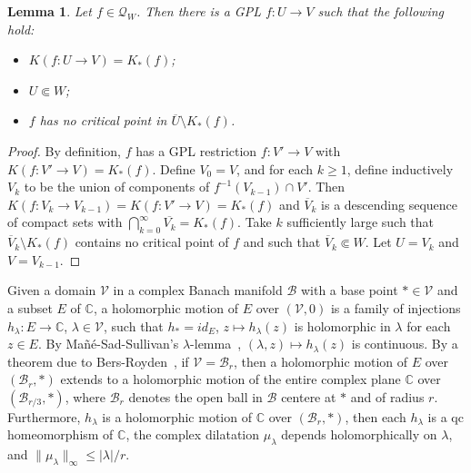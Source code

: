 \documentclass{amsart}
\numberwithin{equation}{section}
\newtheorem{lemma}[theorem]{Lemma}%
\newcommand{\C}{\mathbb C}
\theoremstyle{definition}
\theoremstyle{remark}
\begin{document}
\begin{lemma} \label{lem:smallglp}
Let $f\in \mathcal{Q}_W$. Then there is a GPL $f:U\to V$ such that the following hold:
\begin{itemize} 
\item $K(f:U\to V)=K_*(f)$; 
\item $U\Subset W$; 
\item $f$ has no critical point in $\overline{U}\setminus K_*(f)$. 
\end{itemize}
\end{lemma}
\begin{proof} By definition, $f$ has a GPL restriction $f:V'\to V$ with $K(f:V'\to V)=K_*(f)$. Define $V_0=V$, 
and for each $k\ge 1$, define inductively $V_k$ to be the union of components of $f^{-1}(V_{k-1})\cap V'$. Then $K(f:V_k\to V_{k-1})=K(f:V'\to V)=K_*(f)$ and $\overline{V}_k$ is a descending sequence of compact sets with $\bigcap_{k=0}^\infty \overline{V_k}=K_*(f)$. Take $k$ sufficiently large such that $\overline{V}_k\setminus K_*(f)$ contains no critical point of $f$ and such that $\overline{V}_k\Subset W$. Let $U=V_k$ and $V=V_{k-1}$. 
\end{proof}
Given a domain $\mathcal{V}$ in a complex Banach manifold $\mathcal{B}$ with a base point $\ast\in \mathcal{V}$ and a subset $E$ of $\C$, a holomorphic motion of $E$ over $(\mathcal{V},0)$ is a family of injections $h_\lambda:E\to \C$, $\lambda\in \mathcal{V}$, such that $h_*=id_E$, $z\mapsto h_\lambda(z)$ is holomorphic in $\lambda$ for each $z\in E$. By Ma\~n\'e-Sad-Sullivan's $\lambda$-lemma~\cite{MSS}, $(\lambda,z)\mapsto h_\lambda(z)$ is continuous. By a theorem due to Bers-Royden~\cite{BR}, if $\mathcal{V}=\mathcal{B}_r$, then a holomorphic motion of $E$ over $(\mathcal{B}_r,\ast)$ extends to a holomorphic motion of the entire complex plane $\C$ over $(\mathcal{B}_{r/3},\ast)$, where $\mathcal{B}_r$ denotes the open ball in $\mathcal{B}$ centere at $\ast$ and of radius $r$. Furthermore, $h_\lambda$ is a holomorphic motion of $\C$ over $(\mathcal{B}_r,\ast)$, then each $h_\lambda$ is a qc homeomorphism of $\C$, the complex dilatation $\mu_\lambda$ depends holomorphically on $\lambda$, and $\|\mu_\lambda\|_\infty\le |\lambda|/r.$
\end{document}

